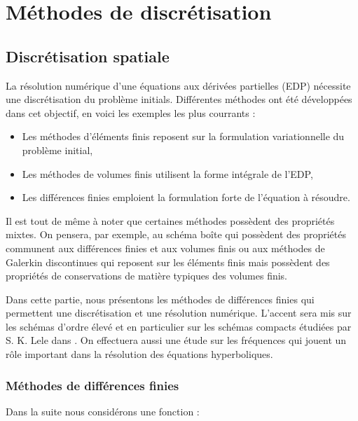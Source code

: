 
\chapter{Méthodes de discrétisation}

\section{Discrétisation spatiale}

La résolution numérique d'une équations aux dérivées partielles (EDP) nécessite une discrétisation du problème
initials. Différentes méthodes ont été développées dans cet objectif,
en voici les exemples les plus courrants :

\begin{itemize}
\item Les méthodes d'éléments finis reposent sur la formulation
  variationnelle du problème initial,

\item Les méthodes de volumes finis utilisent la forme intégrale de
  l'EDP,

\item Les différences finies emploient la formulation forte de
  l'équation à résoudre.
\end{itemize}

Il est tout de même à noter que certaines méthodes possèdent des propriétés mixtes. On pensera, par exemple, au schéma boîte \cite{Abbas2011} qui possèdent des propriétés communent aux différences finies et aux volumes finis ou aux méthodes de Galerkin discontinues qui reposent sur les éléments finis mais possèdent des propriétés de conservations de matière typiques des volumes finis.

Dans cette partie, nous présentons les méthodes de différences finies
qui permettent une discrétisation et une résolution
numérique. L'accent sera mis sur les schémas d'ordre élevé \cite{Desquesnes2007} et en
particulier sur les schémas compacts étudiées par S. K. Lele dans
\cite{Lele1991}. On effectuera aussi une étude sur les fréquences qui
jouent un r\^ole important dans la résolution des équations hyperboliques. 

\subsection{Méthodes de différences finies}

Dans la suite nous considérons une fonction :

